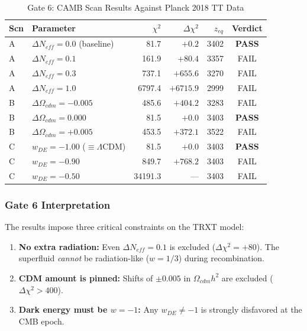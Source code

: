 \documentclass[a4paper,12pt]{article}
\begin{document}
\begin{table}[H]
\centering
\caption{Gate 6: CAMB Scan Results Against Planck 2018 TT Data}
\label{tab:gate6}
\begin{tabular}{@{}llrrrc@{}}
\toprule
\textbf{Scn} & \textbf{Parameter} & \textbf{$\chi^2$} & \textbf{$\Delta\chi^2$} & \textbf{$z_{eq}$} & \textbf{Verdict} \\
\midrule
A & $\Delta N_{eff} = 0.0$ (baseline) & 81.7 & $+0.2$ & 3402 & \textbf{PASS} \\
A & $\Delta N_{eff} = 0.1$ & 161.9 & $+80.4$ & 3357 & FAIL \\
A & $\Delta N_{eff} = 0.3$ & 737.1 & $+655.6$ & 3270 & FAIL \\
A & $\Delta N_{eff} = 1.0$ & 6797.4 & $+6715.9$ & 2999 & FAIL \\
\midrule
B & $\Delta\Omega_{cdm} = -0.005$ & 485.6 & $+404.2$ & 3283 & FAIL \\
B & $\Delta\Omega_{cdm} = 0.000$ & 81.5 & $+0.0$ & 3403 & \textbf{PASS} \\
B & $\Delta\Omega_{cdm} = +0.005$ & 453.5 & $+372.1$ & 3522 & FAIL \\
\midrule
C & $w_{DE} = -1.00$ ($\equiv \Lambda$CDM) & 81.5 & $+0.0$ & 3403 & \textbf{PASS} \\
C & $w_{DE} = -0.90$ & 849.7 & $+768.2$ & 3403 & FAIL \\
C & $w_{DE} = -0.50$ & 34191.3 & --- & 3403 & FAIL \\
\bottomrule
\end{tabular}
\end{table}

\subsubsection{Gate 6 Interpretation}

The results impose three critical constraints on the TRXT model:
\begin{enumerate}
    \item \textbf{No extra radiation:} Even $\Delta N_{eff} = 0.1$ is excluded ($\Delta\chi^2 = +80$). The superfluid \textit{cannot} be radiation-like ($w = 1/3$) during recombination.
    \item \textbf{CDM amount is pinned:} Shifts of $\pm 0.005$ in $\Omega_{cdm} h^2$ are excluded ($\Delta\chi^2 > 400$).
    \item \textbf{Dark energy must be $w = -1$:} Any $w_{DE} \neq -1$ is strongly disfavored at the CMB epoch.
\end{enumerate}
\end{document}
